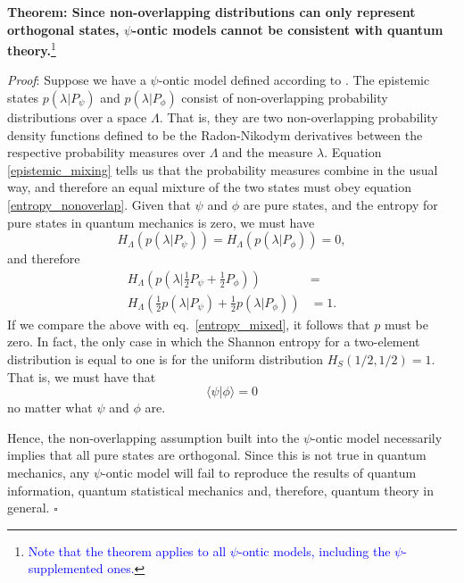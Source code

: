 \documentclass[10pt,twocolumn, nofootinbib]{revtex4-2}
\begin{document}
\textbf{Theorem: Since non-overlapping distributions can only represent orthogonal states, $\psi$-ontic models cannot be consistent with quantum theory.}\footnote{\textcolor{blue}{Note that the theorem applies to all $\psi$-ontic models, including the $\psi$-supplemented ones.}}

\emph{Proof}: Suppose we have a $\psi$-ontic model defined according to \cite{Harrigan:2010}. The epistemic states $p(\lambda|P_\psi)$ and $p(\lambda|P_\phi)$ consist of non-overlapping probability distributions over a space $\Lambda$. That is, they are two non-overlapping probability density functions defined to be the Radon-Nikodym derivatives between the respective probability measures over $\Lambda$ and the measure $\lambda$. Equation \ref{epistemic_mixing} tells us that the probability measures combine in the usual way, and therefore an equal mixture of the two states must obey equation \ref{entropy_nonoverlap}. Given that $\psi$ and $\phi$ are pure states, and the entropy for pure states in quantum mechanics is zero, we must have
\begin{equation}\label{entropy_pure}
	H_\Lambda(p(\lambda|P_\psi)) = H_\Lambda(p(\lambda|P_\phi)) = 0,
\end{equation}
and therefore
\begin{equation}\label{required_entropy}
	\begin{aligned}
		H_\Lambda\left(p(\lambda|\frac{1}{2}P_\psi + \frac{1}{2}P_\phi)\right) &= \\
		H_\Lambda\left(\frac{1}{2}p(\lambda|P_\psi) + \frac{1}{2}p(\lambda|P_\phi)\right) 
		&= 1.
	\end{aligned}
\end{equation}
If we compare the above with eq.~\ref{entropy_mixed}, it follows that $p$ must be zero. In fact, the only case in which the Shannon entropy for a two-element distribution is equal to one is for the uniform distribution $H_S(1/2, 1/2) = 1$.  That is, we must have that
\begin{equation}\label{orthogonal}
	\langle \psi | \phi \rangle = 0
\end{equation}
no matter what $\psi$ and $\phi$ are.

Hence, the non-overlapping assumption built into the $\psi$-ontic model necessarily implies that all pure states are orthogonal. Since this is not true in quantum mechanics, any $\psi$-ontic model will fail to reproduce the results of quantum information, quantum statistical mechanics and, therefore, quantum theory in general. $\square$
\end{document}
